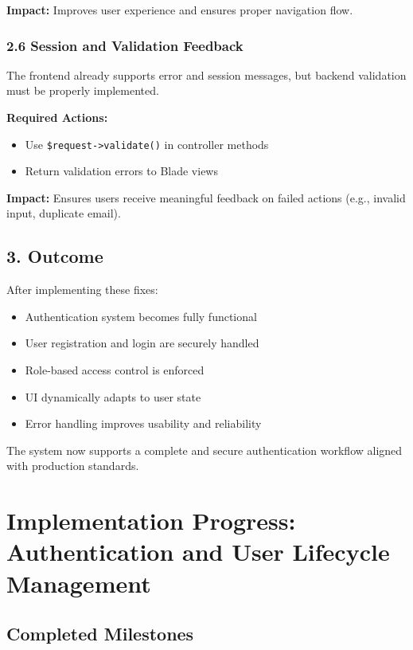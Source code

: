 \documentclass[12pt,a4paper]{article}
\begin{document}
\textbf{Impact:} Improves user experience and ensures proper navigation flow.

\subsubsection{2.6 Session and Validation Feedback}

The frontend already supports error and session messages, but backend validation must be properly implemented.

\textbf{Required Actions:}
\begin{itemize}[noitemsep]
    \item Use \texttt{\$request->validate()} in controller methods
    \item Return validation errors to Blade views
\end{itemize}

\textbf{Impact:} Ensures users receive meaningful feedback on failed actions (e.g., invalid input, duplicate email).

\subsection{3. Outcome}

After implementing these fixes:

\begin{itemize}[noitemsep]
    \item Authentication system becomes fully functional
    \item User registration and login are securely handled
    \item Role-based access control is enforced
    \item UI dynamically adapts to user state
    \item Error handling improves usability and reliability
\end{itemize}

The system now supports a complete and secure authentication workflow aligned with production standards.


\section{Implementation Progress: Authentication and User Lifecycle Management}

\subsection{Completed Milestones}
\end{document}

